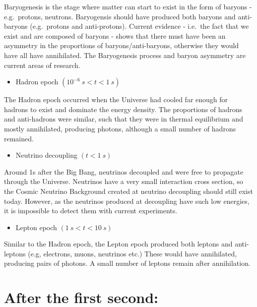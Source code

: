 \documentclass[11pt,a4paper]{book}
\providecommand{\tightlist}{%
  \setlength{\itemsep}{0pt}\setlength{\parskip}{0pt}}
\begin{document}
Baryogenesis is the stage where matter can start to exist in the form of
baryons - e.g.~protons, neutrons. Baryogensis should have produced both
baryons and anti-baryons (e.g.~protons and anti-protons). Current
evidence - i.e.~the fact that we exist and are composed of baryons -
shows that there must have been an asymmetry in the proportions of
baryons/anti-baryons, otherwise they would have all have annihilated.
The Baryogenesis process and baryon asymmetry are current areas of
research.

\begin{itemize}
\tightlist
\item
  Hadron epoch \((10^{-6}~s < t < 1~s)\)
\end{itemize}

The Hadron epoch occurred when the Universe had cooled far enough for
hadrons to exist and dominate the energy density. The proportions of
hadrons and anti-hadrons were similar, such that they were in thermal
equilibrium and mostly annihilated, producing photons, although a small
number of hadrons remained.

\begin{itemize}
\tightlist
\item
  Neutrino decoupling \((t < 1~s)\)
\end{itemize}

Around 1s after the Big Bang, neutrinos decoupled and were free to
propagate through the Universe. Neutrinos have a very small interaction
cross section, so the Cosmic Neutrino Background created at neutrino
decoupling should still exist today. However, as the neutrinos produced
at decoupling have such low energies, it is impossible to detect them
with current experiments.

\begin{itemize}
\tightlist
\item
  Lepton epoch \((1~s < t < 10~s)\)
\end{itemize}

Similar to the Hadron epoch, the Lepton epoch produced both leptons and
anti-leptons (e.g, electrons, muons, neutrinos etc.) These would have
annihilated, producing pairs of photons. A small number of leptons
remain after annihilation.

\hypertarget{sec:after_1s}{%
\section{After the first second:}\label{sec:after_1s}}
\end{document}
